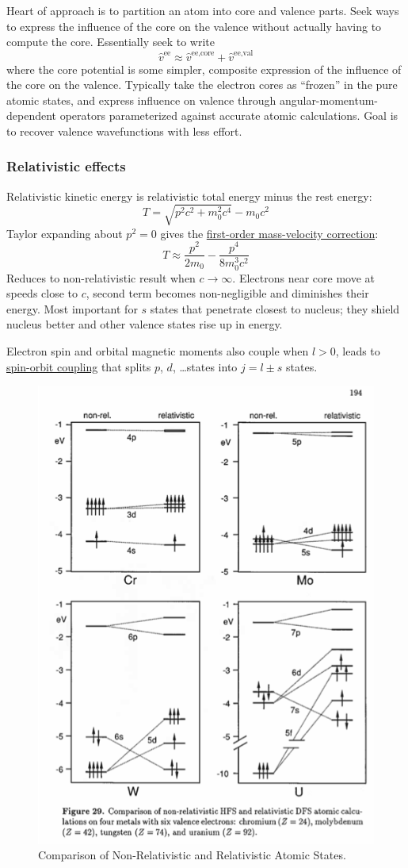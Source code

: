 \documentclass[11pt]{article}
\begin{document}
Heart of approach is to partition an atom into core and valence parts.  Seek ways to
express the influence of the core on the valence without actually having to compute the
core. Essentially seek to write 
\[ \hat{v}^\text{ee} \approx \hat{v}^\text{ee,core} +
\hat{v}^\text{ee,val} \] 
where the core potential is some simpler, composite expression of
the influence of the core on the valence.  Typically take the electron cores as ``frozen''
in the pure atomic states, and express influence on valence through
 angular-momentum-dependent operators parameterized against accurate atomic calculations.  Goal is to recover valence wavefunctions with less effort.

\subsubsection{Relativistic effects}
\label{sec:orgc3962d7}
Relativistic kinetic energy is relativistic total energy minus the rest energy:
 \[T = \sqrt{p^2c^2 + m_0^2c^4} - m_0c^2\]
Taylor expanding about \(p^2 = 0\) gives the \uline{first-order mass-velocity correction}:
\[ T \approx \frac{p^2}{2m_0} - \frac{p^4}{8 m_0^3 c^2}\]
Reduces to non-relativistic result when \(c\rightarrow\infty\).  Electrons near core move at speeds close to \(c\), second term becomes non-negligible and diminishes their energy.  Most important for \(s\) states that penetrate closest to nucleus; they shield nucleus better and other valence states rise up in energy.

Electron spin and orbital magnetic moments also couple when \(l>0\), leads to \uline{spin-orbit coupling} that splits \(p\), \(d\), \ldots states into \(j = l \pm s\) states. 

\begin{figure}[htbp]
\centering
\includegraphics[width=.5\textwidth]{./Images/Relativity.png}
\caption{Comparison of Non-Relativistic and Relativistic Atomic States.}
\end{figure}
\end{document}
